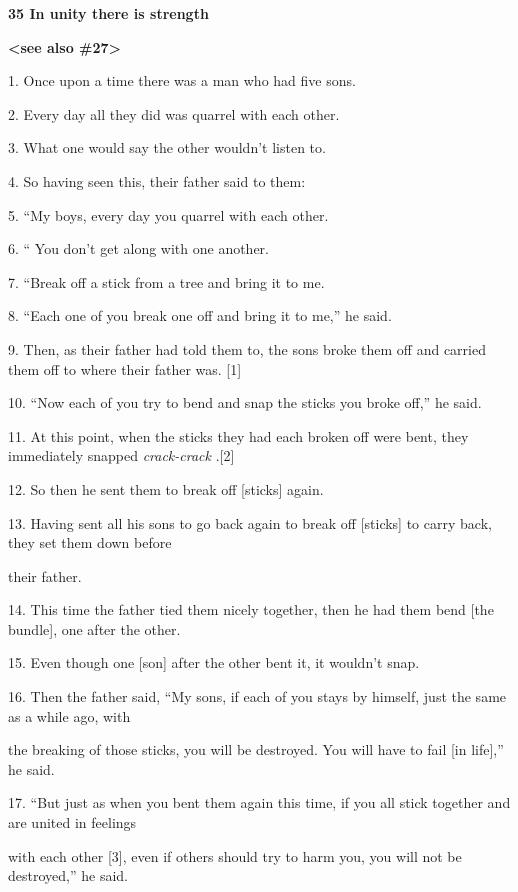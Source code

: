 
{\Large{}\textbf{35 In unity there is strength }}

{\Large{}\textbf{<see also \#27>}}

{\Large{}1. Once upon a time there was a man who had five sons.}

{\Large{}2. Every day all they did was quarrel with each other.}

{\Large{}3. What one would say the other wouldn't listen to.}

{\Large{}4. So having seen this, their father said to them:}

{\Large{}5. ``My boys, every day you quarrel with each other.}

{\Large{}6. `` You don't get along with one another.}

{\Large{}7. ``Break off a stick from a tree and bring it to me.}

{\Large{}8. ``Each one of you break one off and bring it to me,'' he said.}

{\Large{}9. Then, as their father had told them to, the sons broke them off and
carried them off to where their father was. [1]}

{\Large{}10. ``Now each of you try to bend and snap the sticks you broke off,''
he said.}

{\Large{}11. At this point, when the sticks they had each broken off were bent,
they immediately snapped }{\Large{}\textit{crack-crack}}{\Large{} .[2]}

{\Large{}12. So then he sent them to break off [sticks] again.}

{\Large{}13. Having sent all his sons to go back again to break off [sticks] to
carry back, they set them down before       }

{\Large{}their father.}

{\Large{}14. This time the father tied them nicely together, then he had them bend
[the bundle], one after the other.}

{\Large{}15. Even though one [son] after the other bent it, it wouldn't snap.}

{\Large{}16. Then the father said, ``My sons, if each of you stays by himself,
just the same as a while ago, with       }

{\Large{}the breaking of those sticks, you will be destroyed.  You will have to
fail [in life],'' he said.}

{\Large{}17. ``But just as when you bent them again this time, if you all stick
together and are united in feelings       }

{\Large{}with each other [3], even if others should try to harm you, you will not
be destroyed,'' he said.}

